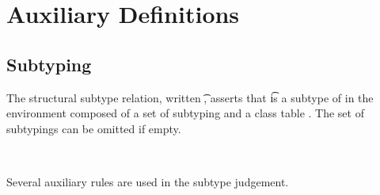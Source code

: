 \documentclass[a4paper,USenglish]{tex/lipics-v2016}
\begin{document}



\appendix
\section{Auxiliary Definitions}%

\subsection{Subtyping}

The structural subtype relation, written \StrSub\M\K\t\tp, asserts that \t
is a subtype of \tp in the environment composed of a set of subtyping \M and
a class table \K.   The set of subtypings can be omitted if empty.

~\\

\begin{mathpar}


\end{mathpar}

Several auxiliary rules are used in the subtype judgement. 

\begin{mathpar}



\end{mathpar}
\end{document}
